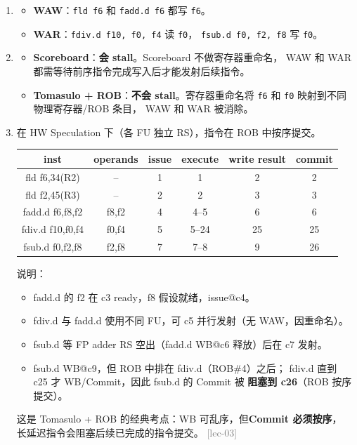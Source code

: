 \documentclass[11pt,a4paper]{article}
\newcommand{\lec}[1]{\textcolor{gray}{[lec-#1]}}
\begin{document}
\begin{enumerate}[label=(\arabic*),leftmargin=*]
  \item
  \begin{itemize}[nosep]
    \item \textbf{WAW}：\texttt{fld f6} 和 \texttt{fadd.d f6} 都写 \texttt{f6}。
    \item \textbf{WAR}：\texttt{fdiv.d f10, f0, f4} 读 \texttt{f0}，
          \texttt{fsub.d f0, f2, f8} 写 \texttt{f0}。
  \end{itemize}

  \item
  \begin{itemize}[nosep]
    \item \textbf{Scoreboard}：\textbf{会 stall}。Scoreboard 不做寄存器重命名，
          WAW 和 WAR 都需等待前序指令完成写入后才能发射后续指令。
    \item \textbf{Tomasulo + ROB}：\textbf{不会 stall}。寄存器重命名将
          \texttt{f6} 和 \texttt{f0} 映射到不同物理寄存器/ROB 条目，
          WAW 和 WAR 被消除。
  \end{itemize}

  \item 在 HW Speculation 下（各 FU 独立 RS），指令在 ROB 中按序提交。

  \vspace{4pt}
  \begin{tabular}{c|c|c|c|c|c}
  inst & operands & issue & execute & write result & commit \\
  \midrule
  fld   f6,34(R2) & --    & 1  & 1   & 2  & 2 \\
  fld   f2,45(R3) & --    & 2  & 2   & 3  & 3 \\
  fadd.d f6,f8,f2& f8,f2 & 4  & 4--5& 6  & 6 \\
  fdiv.d f10,f0,f4& f0,f4& 5  & 5--24& 25 & 25 \\
  fsub.d f0,f2,f8& f2,f8 & 7  & 7--8& 9  & 26 \\
  \end{tabular}

  \vspace{4pt}
  \noindent 说明：
  \begin{itemize}[nosep]
    \item fadd.d 的 f2 在 c3 ready，f8 假设就绪，issue@c4。
    \item fdiv.d 与 fadd.d 使用不同 FU，可 c5 并行发射（无 WAW，因重命名）。
    \item fsub.d 等 FP adder RS 空出（fadd.d WB@c6 释放）后在 c7 发射。
    \item fsub.d WB@c9，但 ROB 中排在 fdiv.d（ROB\#4）之后；
          fdiv.d 直到 c25 才 WB/Commit，因此 fsub.d 的 Commit 被
          \textbf{阻塞到 c26}（ROB 按序提交）。
  \end{itemize}

  \noindent 这是 Tomasulo + ROB 的经典考点：WB 可乱序，但\textbf{Commit 必须按序}，
  长延迟指令会阻塞后续已完成的指令提交。 \lec{03}
\end{enumerate}
\end{document}
